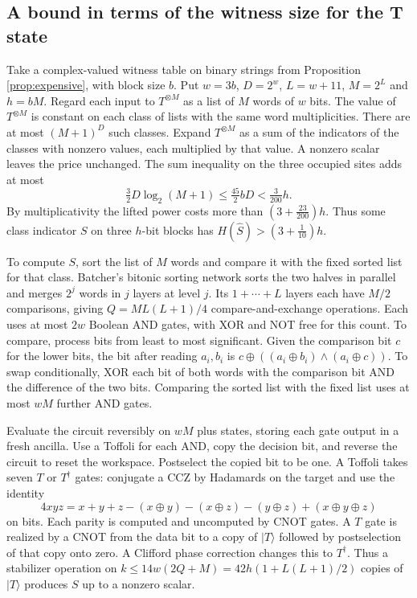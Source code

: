 \documentclass[11pt]{article}
\theoremstyle{definition}
\newcommand{\ket}[1]{|#1\rangle}
\begin{document}
\subsection{A bound in terms of the witness size for the T state}\label{sec:tquant}
Take a complex-valued witness table on binary strings from Proposition \ref{prop:expensive}, with block size $b$. Put
$w=3b$, $D=2^w$, $L=w+11$, $M=2^L$ and $h=bM$. Regard each input to $T^{\otimes M}$ as a list of $M$ words of $w$ bits.
The value of $T^{\otimes M}$ is constant on each class of lists with the same word multiplicities. There are at most
$(M+1)^D$ such classes. Expand $T^{\otimes M}$ as a sum of the indicators of the classes with nonzero values,
each multiplied by that value. A nonzero scalar leaves the price unchanged. The sum inequality on the three occupied sites adds at most
\[
\tfrac32 D\log_2(M+1)\le\tfrac{45}{2}bD<\tfrac{3}{200}h.
\]
By multiplicativity the lifted power costs more than $(3+\frac{23}{200})h$. Thus some class indicator $S$ on three $h$-bit blocks has $H(\hat S)>(3+\frac1{10})h$.

To compute $S$, sort the list of $M$ words and compare it with the fixed sorted list for that class. Batcher's bitonic sorting network \cite{Batcher} sorts the two halves in parallel and merges $2^j$ words in $j$ layers at level $j$. Its $1+\cdots+L$ layers each have $M/2$ comparisons, giving $Q=ML(L+1)/4$ compare-and-exchange operations.
Each uses at most $2w$ Boolean AND gates, with XOR and NOT free for this count. To compare, process bits from least to most significant. Given the comparison bit $c$ for the lower bits, the bit after reading $a_i,b_i$ is $c\oplus((a_i\oplus b_i)\land(a_i\oplus c))$.
To swap conditionally, XOR each bit of both words with the comparison bit AND the difference of the two bits. Comparing the sorted list with the fixed list uses at most $wM$ further AND gates.

Evaluate the circuit reversibly on $wM$ plus states, storing each gate output in a fresh ancilla. Use a Toffoli for each AND, copy the decision bit, and reverse the circuit to reset the workspace. Postselect the copied bit to be one. A Toffoli takes seven $T$ or $T^\dagger$ gates: conjugate a CCZ by Hadamards on the target and use the identity
\[
4xyz=x+y+z-(x\oplus y)-(x\oplus z)-(y\oplus z)+(x\oplus y\oplus z)
\]
on bits. Each parity is computed and uncomputed by CNOT gates. A $T$ gate is realized by a CNOT from the data bit to a copy of $\ket T$ followed by postselection of that copy onto zero. A Clifford phase correction changes this to $T^\dagger$. Thus a stabilizer operation on $k\le14w(2Q+M)=42h(1+L(L+1)/2)$ copies of $\ket T$ produces $S$ up to a nonzero scalar.
\end{document}
